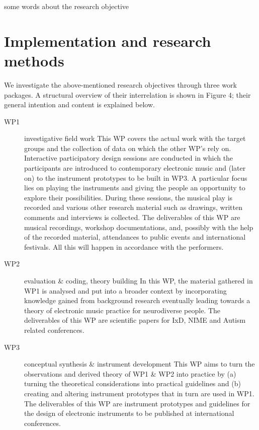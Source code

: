 \documentclass{chi-ext}
\begin{document}
\begin{multicols}{2}
some words about the research objective

\section{Implementation and research methods}
\label{sec:timeline}


We investigate the above-mentioned research objectives through three work packages. A structural overview of their interrelation is shown in Figure 4; their general intention and content is explained below.
\begin{description}
\item[WP1] investigative field work This WP covers the actual work with the target groups and the collection of data on which the other WP’s rely on. Interactive participatory design sessions are conducted in which the participants are introduced to contemporary electronic music and (later on) to the instrument prototypes to be built in WP3. A particular focus lies on playing the instruments and giving the people an opportunity to explore their possibilities. During these sessions, the musical play is recorded and various other research material such as drawings, written comments and interviews is collected.
The deliverables of this WP are musical recordings, workshop documentations, and, possibly with the help of the recorded material, attendances to public events and international festivals. All this will happen in accordance with the performers.
\item[WP2] evaluation \& coding, theory building In this WP, the material gathered in WP1 is analysed and put into a broader context by incorporating knowledge gained from background research eventually leading towards a theory of electronic music practice for neurodiverse people.
The deliverables of this WP are scientific papers for IxD, NIME and Autism related conferences.
	\item[WP3] conceptual synthesis \& instrument development This WP aims to turn the observations and derived theory of WP1 \& WP2 into practice by (a) turning the theoretical considerations into practical guidelines and (b) creating and altering instrument prototypes that in turn are used in WP1.
The deliverables of this WP are instrument prototypes and guidelines for the design of electronic instruments to be published at international conferences.
\end{description}


\end{multicols}
\end{document}
